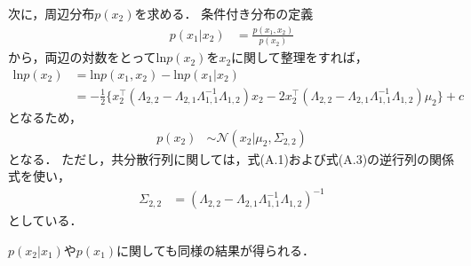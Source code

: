 \documentclass[11pt,a4paper]{jsarticle}
\begin{document}
次に，周辺分布$p(x_2)$を求める．
条件付き分布の定義
\begin{align}
p(x_1 | x_2)
& =
\frac{p(x_1, x_2)}{p(x_2)}
\end{align}
から，両辺の対数をとって$\mathrm{ln} p(x_2)$を$x_2$に関して整理をすれば，
\begin{align}
\mathrm{ln} p(x_2)
& =
\mathrm{ln} p(x_1, x_2) - \mathrm{ln} p(x_1 | x_2) \nonumber \\
& =
-\frac{1}{2} \bigl\{ x_2^\top (\Lambda_{2,2} - \Lambda_{2,1} \Lambda_{1,1}^{-1} \Lambda_{1,2}) x_2
- 2 x_2^\top (\Lambda_{2,2} - \Lambda_{2,1} \Lambda_{1,1}^{-1} \Lambda_{1,2}) \mu_2 \bigr\} + c
\end{align}
となるため，
\begin{align}
p(x_2)
& \sim
\mathcal{N} (x_2 | \mu_2, \Sigma_{2,2})
\end{align}
となる．
ただし，共分散行列に関しては，式(A.1)および式(A.3)の逆行列の関係式を使い，
\begin{align}
\Sigma_{2,2}
& =
(\Lambda_{2,2} - \Lambda_{2,1} \Lambda_{1,1}^{-1} \Lambda_{1,2})^{-1}
\end{align}
としている．

$p(x_2 | x_1)$や$p(x_1)$に関しても同様の結果が得られる．
\end{document}
